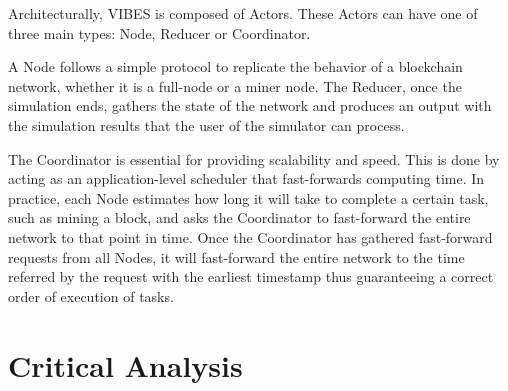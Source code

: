 Architecturally, VIBES is composed of Actors. These Actors can have one of three main types: Node, Reducer or Coordinator.

A Node follows a simple protocol to replicate the behavior of a blockchain network, whether it is a full-node or a miner node. The Reducer, once the simulation ends, gathers the state of the network and produces an output with the simulation results that the user of the simulator can process.

The Coordinator is essential for providing scalability and speed. This is done by acting as an application-level scheduler that fast-forwards computing time. In practice, each Node estimates how long it will take to complete a certain task, such as mining a block, and asks the Coordinator to fast-forward the entire network to that point in time. Once the Coordinator has gathered fast-forward requests from all Nodes, it will fast-forward the entire network to the time referred by the request with the earliest timestamp thus guaranteeing a correct order of execution of tasks.


\section{Critical Analysis}
\label{sec:critical_analysis}


